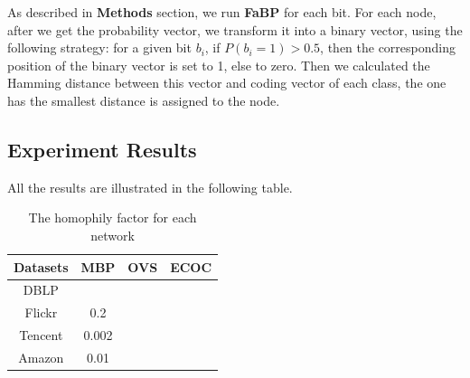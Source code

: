 As described in \textbf{Methods} section, we run \textbf{FaBP} for each bit. For each node, after we get the probability vector, we transform it into a binary vector, using the following strategy: for a given bit $b_i$, if $P(b_i=1) > 0.5$, then the corresponding position of the binary vector is set to 1, else to zero. Then we calculated the Hamming distance between this vector and coding vector of each class, the one has the smallest distance is assigned to the node. 

\subsection{Experiment Results}
All the results are illustrated in the following table.
\begin{table}[!ht]
\centering
\begin{tabular}{c|ccc}
\toprule
\textbf{Datasets} & \textbf{MBP} & \textbf{OVS} & \textbf{ECOC}\\
\midrule
DBLP & \\
Flickr & 0.2\\
Tencent & 0.002\\
Amazon & 0.01\\
\bottomrule
\end{tabular}
\caption{The homophily factor for each network}
\end{table} 











